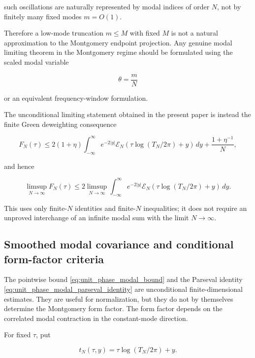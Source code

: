 \documentclass[11pt]{amsart}
\numberwithin{equation}{section}
\theoremstyle{plain}
\theoremstyle{definition}
\theoremstyle{remark}
\begin{document}
such oscillations are naturally represented by modal indices of order
\(N\), not by finitely many fixed modes \(m=O(1)\).

Therefore a low-mode truncation \(m\le M\) with fixed \(M\) is not a
natural approximation to the Montgomery endpoint projection. Any genuine
modal limiting theorem in the Montgomery regime should be formulated
using the scaled modal variable

\begin{equation}
\theta=\frac{m}{N}
\end{equation}

or an equivalent frequency-window formulation.

The unconditional limiting statement obtained in the present paper is
instead the finite Green deweighting consequence

\begin{equation}
F_N(\tau)
\le
2(1+\eta)
\int_{-\infty}^{\infty}
e^{-2|y|}
\mathcal E_N(\tau\log(T_N/2\pi)+y)\,dy
+
\frac{1+\eta^{-1}}{N},
\end{equation}

and hence

\begin{equation}
\limsup_{N\to\infty}F_N(\tau)
\le
2
\limsup_{N\to\infty}
\int_{-\infty}^{\infty}
e^{-2|y|}
\mathcal E_N(\tau\log(T_N/2\pi)+y)\,dy.
\end{equation}

This uses only finite-\(N\) identities and finite-\(N\) inequalities; it
does not require an unproved interchange of an infinite modal sum with
the limit \(N\to\infty\).

\subsection{Smoothed modal covariance and conditional form-factor criteria}
\label{subsec:smoothed_modal_covariance_criteria}

The pointwise bound \eqref{eq:unit_phase_modal_bound} and the Parseval
identity \eqref{eq:unit_phase_modal_parseval_identity} are unconditional
finite-dimensional estimates. They are useful for normalization, but
they do not by themselves determine the Montgomery form factor. The
form factor depends on the correlated modal contraction in the
constant-mode direction.

For fixed \(\tau\), put

\begin{equation}
t_N(\tau,y)=\tau\log(T_N/2\pi)+y.
\label{eq:modal_covariance_t_parameter}
\end{equation}
\end{document}
